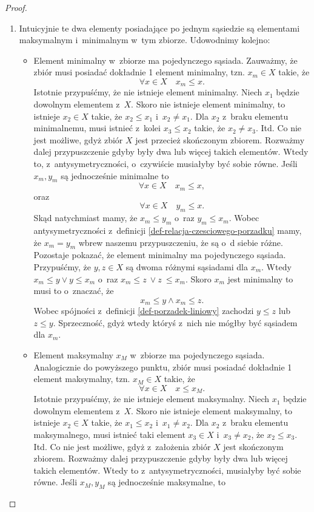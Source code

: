\documentclass[12pt,a4paper]{report}
\begin{document}
\begin{proof}
\begin{enumerate}
\item Intuicyjnie te dwa elementy posiadające po jednym sąsiedzie są elementami maksymalnym i~minimalnym w~tym zbiorze. Udowodnimy kolejno:
\begin{itemize}
\item Element minimalny w~zbiorze ma pojedynczego sąsiada. Zauważmy, że zbiór musi posiadać dokładnie 1 element minimalny, tzn. $x_m \in X$ takie, że 
$$
\forall x \in X \quad x_m \leq x.
$$
Istotnie przypuśćmy, że nie istnieje element minimalny. Niech $x_1$ będzie dowolnym elementem z~$X$. Skoro nie istnieje element minimalny, to istnieje $x_2 \in X$ takie, że $x_2 \leq x_1$ i~$x_2 \neq x_1$. Dla $x_2$ z~braku elementu minimalnemu, musi istnieć z~kolei $x_3 \leq x_2$ takie, że $x_2 \neq x_3$. Itd. Co nie jest możliwe, gdyż zbiór $X$ jest przecież skończonym zbiorem.
Rozważmy dalej przypuszczenie gdyby były dwa lub więcej takich elementów. Wtedy to, z~antysymetryczności, o~czywiście musiałyby być sobie równe. Jeśli $x_m, y_m$ są jednocześnie minimalne to
$$
\forall x \in X \quad x_m \leq x,
$$
oraz 
$$
\forall x \in X \quad y_m \leq x.
$$
Skąd natychmiast mamy, że $ x_m \leq y_m$ o~raz $y_m \leq x_m$. Wobec antysymetryczności z~definicji \ref{def-relacja-czesciowego-porzadku} mamy, że $x_m = y_m$ wbrew naszemu przypuszczeniu, że są o~d siebie różne.
Pozostaje pokazać, że element minimalny ma pojedynczego sąsiada. Przypuśćmy, że $y,z \in X$ są dwoma różnymi sąsiadami dla $x_m$. Wtedy $ x_m \leq y \lor y \leq x_m$ o~raz $ x_m \leq z~\lor z~\leq x_m$. Skoro $x_m$ jest minimalny to musi to o~znaczać, że
$$
x_m \leq y \land x_m \leq z.
$$ 
Wobec spójności z~definicji \ref{def-porzadek-liniowy} zachodzi $y \leq z$ lub $z \leq y$. Sprzeczność, gdyż wtedy któryś z~nich nie mógłby być sąsiadem dla $x_m$.
\item Element maksymalny $x_M$ w~zbiorze ma pojedynczego sąsiada. Analogicznie do powyższego punktu, zbiór musi posiadać dokładnie 1 element maksymalny, tzn. $x_M \in X$ takie, że
$$\forall x \in X \quad x \leq x_M.$$
Istotnie przypuśćmy, że nie istnieje element maksymalny. Niech $x_1$ będzie dowolnym elementem z~$X$. Skoro nie istnieje element maksymalny, to istnieje $x_2 \in X$ takie, że $x_1 \leq x_2$ i~$x_1 \neq x_2$. Dla $x_2$ z~braku elementu maksymalnego, musi istnieć taki element $x_3 \in X$ i~$x_3 \neq x_2$, że $x_2 \leq x_3$. Itd. Co nie jest możliwe, gdyż z~założenia zbiór $X$ jest skończonym zbiorem.
Rozważmy dalej przypuszczenie gdyby były dwa lub więcej takich elementów. Wtedy to z~antysymetryczności, musiałyby być sobie równe. Jeśli $x_M, y_M$ są jednocześnie maksymalne, to 

\end{itemize}
\end{enumerate}
\end{proof}
\end{document}
